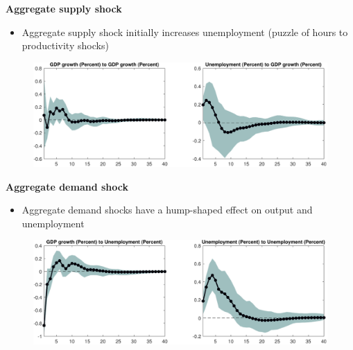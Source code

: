 
\begin{frame}
{\textbf{Aggregate supply shock}}

\begin{itemize}
\item Aggregate supply shock initially increases unemployment (puzzle of
hours to productivity shocks)
\end{itemize}

\begin{figure}[h]
\includegraphics[width=.8\textwidth]{BQ_IR_1.pdf}
\end{figure}
\end{frame}


\begin{frame}
{\textbf{Aggregate demand shock}}

\begin{itemize}
\item Aggregate demand shocks have a hump-shaped effect on output and
unemployment
\end{itemize}

\begin{figure}[h]
\vspace{.3cm}\includegraphics[width=.8\textwidth]{BQ_IR_2.pdf}
\end{figure}
\end{frame}


